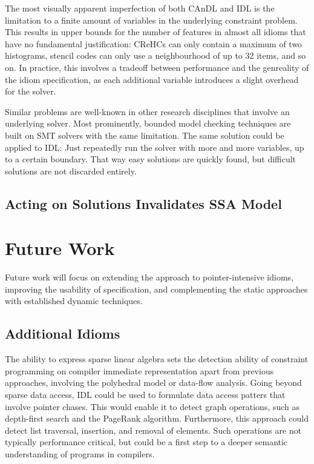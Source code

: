     The most visually apparent imperfection of both CAnDL and IDL is the
    limitation to a finite amount of variables in the underlying constraint
    problem.
    This results in upper bounds for the number of features in almost all idioms
    that have no fundamental justification:
    CReHCs can only contain a maximum of two histograms, stencil codes can only
    use a neighbourhood of up to 32 items, and so on.
    In practice, this involves a tradeoff between performance and the genreality
    of the idiom specification, as each additional variable introduces a slight
    overhead for the solver.

    Similar problems are well-known in other research disciplines that involve
    an underlying solver.
    Most prominently, bounded model checking techniques are built on SMT solvers
    with the same limitation.
    The same solution could be applied to IDL: Just repeatedly run the solver
    with more and more variables, up to a certain boundary.
    That way easy solutions are quickly found, but difficult solutions are not
    discarded entirely.

\subsection{Acting on Solutions Invalidates SSA Model}

\pagebreak
\section{Future Work}

    Future work will focus on extending the approach to pointer-intensive
    idioms, improving the usability of specification, and complementing
    the static approaches with established dynamic techniques.

\subsection{Additional Idioms}

    The ability to express sparse linear algebra sets the detection ability of
    constraint programming on compiler immediate representation apart from
    previous approaches, involving the polyhedral model or data-flow analysis.
    Going beyond sparse data access, IDL could be used to formulate data access
    patters that involve pointer chases.
    This would enable it to detect graph operations, such as depth-first search
    and the PageRank algorithm.
    Furthermore, this approach could detect list traversal, insertion, and
    removal of elements.
    Such operations are not typically performance critical, but could be a first
    step to a deeper semantic understanding of programs in compilers.


